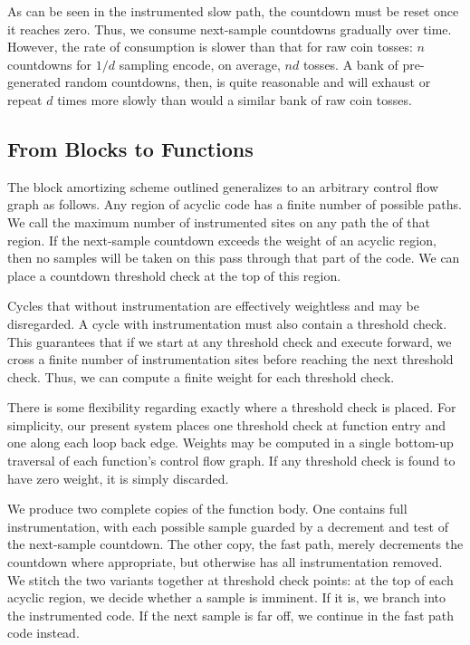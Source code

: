 As can be seen in the instrumented slow path, the countdown must be
reset once it reaches zero.  Thus, we consume next-sample countdowns
gradually over time.  However, the rate of consumption is slower
than that for raw coin tosses: $n$ countdowns for $1/d$ sampling
encode, on average, $nd$ tosses.  A bank of pre-generated random
countdowns, then, is quite reasonable and will exhaust or repeat $d$
times more slowly than would a similar bank of raw coin tosses.

\subsection{From Blocks to Functions}

The block amortizing scheme outlined generalizes to an
arbitrary control flow graph as follows.  Any region of
acyclic code has a finite number of possible paths.
We call the maximum number of instrumented sites on any path the
 of that region.  If the next-sample countdown exceeds
the weight of an acyclic region, then no samples will be taken on this
pass through that part of the code.  We can place a countdown
threshold check at the top of this region.

Cycles that without instrumentation are effectively weightless and may
be disregarded.  A cycle with instrumentation must also contain a
threshold check.  This guarantees that if we start at any threshold
check and execute forward, we cross a finite number of instrumentation
sites before reaching the next threshold check.  Thus, we can compute
a finite weight for each threshold check.

There is some flexibility regarding exactly where
a threshold check is placed.  For simplicity, our present system
places one threshold check at function entry and one along each loop back
edge.  Weights may be computed in a single bottom-up traversal of each
function's control flow graph.  If any threshold check is found to
have zero weight, it is simply discarded.

We produce two complete copies of the function body.  One contains
full instrumentation, with each possible sample guarded by a decrement
and test of the next-sample countdown.  The other copy, the fast path,
merely decrements the countdown where appropriate, but otherwise has
all instrumentation removed.  We stitch the two variants together at
threshold check points: at the top of each acyclic region, we decide
whether a sample is imminent.  If it is, we branch into the
instrumented code.  If the next sample is far off, we continue in the
fast path code instead.


